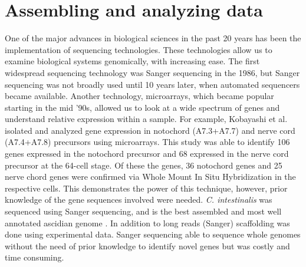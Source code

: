 \section{Assembling and analyzing data}

One of the major advances in biological sciences in the past 20 years has been the implementation of sequencing technologies. These technologies allow us to examine biological systems genomically, with increasing ease. The first widespread sequencing technology was Sanger sequencing in the 1986, but Sanger sequencing was not broadly used until 10 years later, when automated sequencers became available. Another technology, microarrays, which became popular starting in the mid '90s, allowed us to look at a wide spectrum of genes and understand relative expression within a sample. For example, Kobayashi et al. \cite{kobayashi_differential_2013} isolated and analyzed gene expression in notochord (A7.3+A7.7) and nerve cord (A7.4+A7.8) precursors using microarrays. This study was able to identify 106 genes expressed in the notochord precursor and 68 expressed in the nerve cord precursor at the 64-cell stage. Of these the genes, 36 notochord genes and 25 nerve chord genes were confirmed via Whole Mount In Situ Hybridization in the respective cells. This demonstrates the power of this technique, however, prior knowledge of the gene sequences involved were needed. \textit{C. intestinalis} was sequenced using Sanger sequencing, and is the best assembled and most well annotated ascidian genome \cite{dehal_draft_2002}. In addition to long reads (Sanger) scaffolding was done using experimental data\cite{satou_improved_2008}. Sanger sequencing able to sequence whole genomes without the need of prior knowledge to identify novel genes but was costly and time consuming\cite{metzker_emerging_2005,liu_comparison_2012}. 

